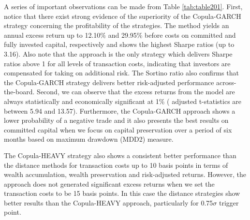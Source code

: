 \documentclass[a4paper,12pt]{report}
\begin{document}
\begin{refsection}
A series of important observations can be made from Table \ref{tab:table201}. First, notice that there exist strong evidence of the superiority of the Copula-GARCH strategy concerning the profitability of the strategies. The method yields an annual excess return up to 12.10\% and 29.95\% before costs on committed and fully invested capital, respectively and shows the highest Sharpe ratios (up to 3.16). Also note that the approach is the only strategy which delivers Sharpe ratios above 1 for all levels of transaction costs, indicating that investors are compensated for taking on additional risk. The Sortino ratio also confirms that the Copula-GARCH strategy delivers better risk-adjusted performance across-the-board. Second, we can observe that the excess returns from the model are always statistically and economically significant at 1\% (\citet*{nw87} adjusted t-statistics are between 5.94 and 13.57). Furthermore, the Copula-GARCH approach shows a lower probability of a negative trade and it also presents the best results on committed capital when we focus on capital preservation over a period of six months based on maximum drawdown (MDD2) measure.

The Copula-HEAVY strategy also shows a consistent better performance than the distance methods for transaction costs up to 10 basis points in terms of wealth accumulation, wealth preservation and risk-adjusted returns. However, the approach does not generated significant excess returns when we set the transaction costs to be 15 basis points. In this case the distance strategies show better results than the Copula-HEAVY approach, particularly for 0.75$\sigma$ trigger point.\\


\end{refsection}
\end{document}
